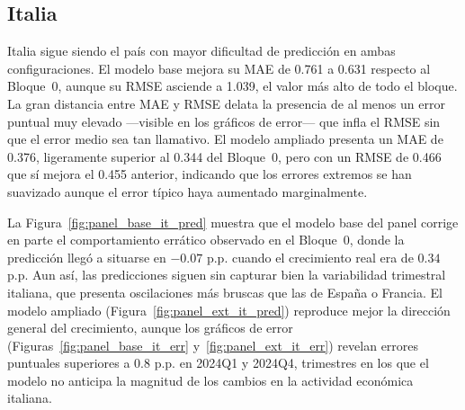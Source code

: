 \FloatBarrier
\subsection{Italia}

Italia sigue siendo el país con mayor dificultad de predicción en ambas configuraciones. El modelo base mejora su MAE de 0.761 a 0.631 respecto al Bloque~0, aunque su RMSE asciende a 1.039, el valor más alto de todo el bloque. La gran distancia entre MAE y RMSE delata la presencia de al menos un error puntual muy elevado ---visible en los gráficos de error--- que infla el RMSE sin que el error medio sea tan llamativo. El modelo ampliado presenta un MAE de 0.376, ligeramente superior al 0.344 del Bloque~0, pero con un RMSE de 0.466 que sí mejora el 0.455 anterior, indicando que los errores extremos se han suavizado aunque el error típico haya aumentado marginalmente.

La Figura~\ref{fig:panel_base_it_pred} muestra que el modelo base del panel corrige en parte el comportamiento errático observado en el Bloque~0, donde la predicción llegó a situarse en $-0.07$ p.p. cuando el crecimiento real era de $0.34$ p.p. Aun así, las predicciones siguen sin capturar bien la variabilidad trimestral italiana, que presenta oscilaciones más bruscas que las de España o Francia. El modelo ampliado (Figura~\ref{fig:panel_ext_it_pred}) reproduce mejor la dirección general del crecimiento, aunque los gráficos de error (Figuras~\ref{fig:panel_base_it_err} y~\ref{fig:panel_ext_it_err}) revelan errores puntuales superiores a 0.8 p.p. en 2024Q1 y 2024Q4, trimestres en los que el modelo no anticipa la magnitud de los cambios en la actividad económica italiana.

